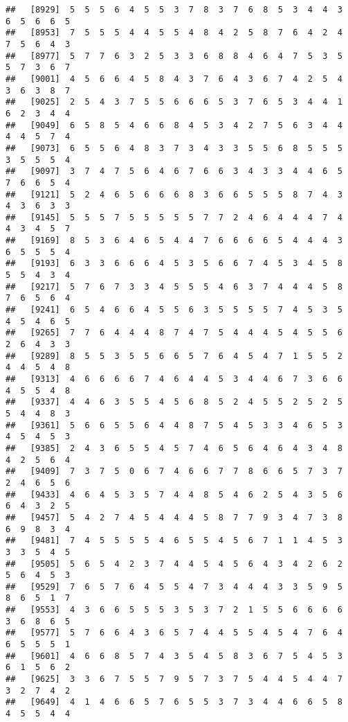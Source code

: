 \documentclass[
]{book}
\begin{document}
\begin{verbatim}
##   [8929]  5  5  5  6  4  5  5  3  7  8  3  7  6  8  5  3  4  4  3  6  5  6  6  5
##   [8953]  7  5  5  5  4  4  5  5  4  8  4  2  5  8  7  6  4  2  4  7  5  6  4  3
##   [8977]  5  7  7  6  3  2  5  3  3  6  8  8  4  6  4  7  5  3  5  5  7  3  6  7
##   [9001]  4  5  6  6  4  5  8  4  3  7  6  4  3  6  7  4  2  5  4  3  6  3  8  7
##   [9025]  2  5  4  3  7  5  5  6  6  6  5  3  7  6  5  3  4  4  1  6  2  3  4  4
##   [9049]  6  5  8  5  4  6  6  8  4  5  3  4  2  7  5  6  3  4  4  4  4  5  7  4
##   [9073]  6  5  5  6  4  8  3  7  3  4  3  3  5  5  6  8  5  5  5  3  5  5  5  4
##   [9097]  3  7  4  7  5  6  4  6  7  6  6  3  4  3  3  4  4  6  5  7  6  6  5  4
##   [9121]  5  2  4  6  5  6  6  6  8  3  6  6  5  5  5  8  7  4  3  4  3  6  3  3
##   [9145]  5  5  5  7  5  5  5  5  5  7  7  2  4  6  4  4  4  7  4  4  3  4  5  7
##   [9169]  8  5  3  6  4  6  5  4  4  7  6  6  6  6  5  4  4  4  3  6  5  5  5  4
##   [9193]  6  3  3  6  6  6  4  5  3  5  6  6  7  4  5  3  4  5  8  5  5  4  3  4
##   [9217]  5  7  6  7  3  3  4  5  5  5  4  6  3  7  4  4  4  5  8  7  6  5  6  4
##   [9241]  6  5  4  6  6  4  5  5  6  3  5  5  5  5  7  4  5  3  5  4  5  4  6  5
##   [9265]  7  7  6  4  4  4  8  7  4  7  5  4  4  4  5  4  5  5  6  2  6  4  3  3
##   [9289]  8  5  5  3  5  5  6  6  5  7  6  4  5  4  7  1  5  5  2  4  4  5  4  8
##   [9313]  4  6  6  6  6  7  4  6  4  4  5  3  4  4  6  7  3  6  6  4  5  5  4  8
##   [9337]  4  4  6  3  5  5  4  5  6  8  5  2  4  5  5  2  5  2  5  5  4  4  8  3
##   [9361]  5  6  6  5  5  6  4  4  8  7  5  4  5  3  3  4  6  5  3  4  5  4  5  3
##   [9385]  2  4  3  6  5  5  4  5  7  4  6  5  6  4  6  4  3  4  8  4  2  5  6  4
##   [9409]  7  3  7  5  0  6  7  4  6  6  7  7  8  6  6  5  7  3  7  2  4  6  5  6
##   [9433]  4  6  4  5  3  5  7  4  4  8  5  4  6  2  5  4  3  5  6  6  4  3  2  5
##   [9457]  5  4  2  7  4  5  4  4  4  5  8  7  7  9  3  4  7  3  8  6  9  8  3  4
##   [9481]  7  4  5  5  5  5  4  6  5  5  4  5  6  7  1  1  4  5  3  3  3  5  4  5
##   [9505]  5  6  5  4  2  3  7  4  4  5  4  5  6  4  3  4  2  6  2  5  6  4  5  3
##   [9529]  7  6  5  7  6  4  5  5  4  7  3  4  4  4  3  3  5  9  5  8  6  5  1  7
##   [9553]  4  3  6  6  5  5  5  3  5  3  7  2  1  5  5  6  6  6  6  3  6  8  6  5
##   [9577]  5  7  6  6  4  3  6  5  7  4  4  5  5  4  5  4  7  6  4  6  5  5  5  1
##   [9601]  4  6  6  8  5  7  4  3  5  4  5  8  3  6  7  5  4  5  3  6  1  5  6  2
##   [9625]  3  3  6  7  5  5  7  9  5  7  3  7  5  4  4  5  4  4  7  3  2  7  4  2
##   [9649]  4  1  4  6  6  5  7  6  5  5  3  7  3  4  4  6  6  5  8  4  5  5  4  4

\end{verbatim}
\end{document}
